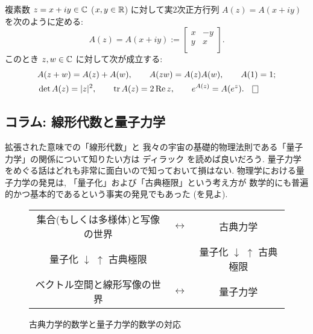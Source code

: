 \documentclass[12pt,twoside]{jarticle}
\begin{document}
\begin{question}
  \label{q:C->M2(R)}
  複素数 $z = x + iy\in{\mathbb C}$ ($x,y\in{\mathbb R}$) に対して実2次正方行列 $A(z)=A(x+iy)$ 
  を次のように定める:
  \begin{equation*}
    A(z) = A(x+iy) :=
    \begin{bmatrix}
      x & -y \\
      y &  x \\
    \end{bmatrix}.
  \end{equation*}
  このとき $z,w\in{\mathbb C}$ に対して次が成立する:
  \begin{align*}
    &
    A(z+w) = A(z) + A(w), \qquad
    A(zw) = A(z)A(w), \qquad
    A(1) = 1;
    \\ &
    \det A(z) = |z|^2, \qquad
    \trace A(z) = 2\Repart z, \qquad
    e^{A(z)} = A(e^z).
    \qed
  \end{align*}
\end{question}


\subsection{コラム: 線形代数と量子力学}

拡張された意味での「線形代数」と
我々の宇宙の基礎的物理法則である「量子力学」の関係について知りたい方は
ディラック \cite{Dirac} を読めば良いだろう.
量子力学をめぐる話はどれも非常に面白いので知っておいて損はない.
物理学における量子力学の発見は, 
「量子化」および「古典極限」という考え方が
数学的にも普遍的かつ基本的であるという事実の発見でもあった
(を見よ).

\begin{figure}[htbp]
  \begin{center}
    \begin{tabular}{ccc}
      集合(もしくは多様体)と写像の世界 & 
      $\longleftrightarrow$ & 
      古典力学 \\
      {\scriptsize 量子化} $\downarrow$ $\uparrow$ {\scriptsize 古典極限} &
      & 
      {\scriptsize 量子化} $\downarrow$ $\uparrow$ {\scriptsize 古典極限} \\
      ベクトル空間と線形写像の世界 & 
      $\longleftrightarrow$ & 
      量子力学 \\
    \end{tabular}
    \caption{古典力学的数学と量子力学的数学の対応}
    \label{fig:c-q}
  \end{center}
\end{figure}
\end{document}
